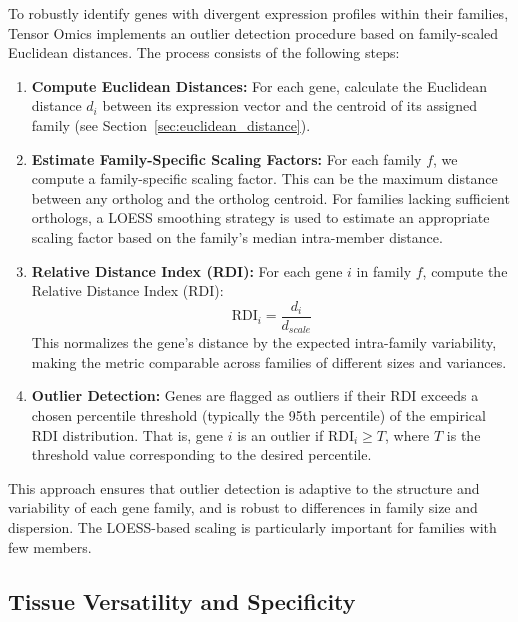 \documentclass[11pt]{article}
\begin{document}
To robustly identify genes with divergent expression profiles within their
families, Tensor Omics implements an outlier detection procedure based on family-scaled
Euclidean distances. The process consists of the following steps:

\begin{enumerate}
	\item \textbf{Compute Euclidean Distances:} For each gene, calculate the Euclidean
	      distance $d_{i}$ between its expression vector and the centroid of its assigned
	      family (see Section~\ref{sec:euclidean_distance}).
	      
	\item \textbf{Estimate Family-Specific Scaling Factors:} For each family $f$,
	      we compute a family-specific scaling factor. This can be the maximum
	      distance between any ortholog and the ortholog centroid. For families lacking
	      sufficient orthologs, a LOESS smoothing strategy is used to estimate an
	      appropriate scaling factor based on the family's median intra-member
	      distance.
	      
	\item \textbf{Relative Distance Index (RDI):} For each gene $i$ in family
	      $f$, compute the Relative Distance Index (RDI):
	      \[
	      	\mathrm{RDI}_{i} = \frac{d_{i}}{d_{scale}}\text{}
	      \]
	      This normalizes the gene's distance by the expected intra-family
	      variability, making the metric comparable across families of different sizes
	      and variances.
	      
	\item \textbf{Outlier Detection:} Genes are flagged as outliers if their RDI
	      exceeds a chosen percentile threshold (typically the 95th percentile) of
	      the empirical RDI distribution. That is, gene $i$ is an outlier if
	      $\mathrm{RDI}_{i} \geq T$, where $T$ is the threshold value corresponding to
	      the desired percentile.
\end{enumerate}

\noindent
This approach ensures that outlier detection is adaptive to the structure and variability
of each gene family, and is robust to differences in family size and
dispersion. The LOESS-based scaling is particularly important for families with
few members.

\subsection{Tissue Versatility and Specificity}
\label{sec:tissue_versatility}
\end{document}
